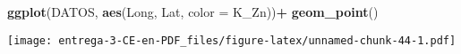 \documentclass[
]{article}
\newenvironment{Shaded}{\begin{snugshade}}{\end{snugshade}}
\newcommand{\DataTypeTok}[1]{\textcolor[rgb]{0.13,0.29,0.53}{#1}}
\newcommand{\DecValTok}[1]{\textcolor[rgb]{0.00,0.00,0.81}{#1}}
\newcommand{\KeywordTok}[1]{\textcolor[rgb]{0.13,0.29,0.53}{\textbf{#1}}}
\newcommand{\NormalTok}[1]{#1}
\newcommand{\OperatorTok}[1]{\textcolor[rgb]{0.81,0.36,0.00}{\textbf{#1}}}
\newcommand{\StringTok}[1]{\textcolor[rgb]{0.31,0.60,0.02}{#1}}
\begin{document}
\begin{Shaded}
\begin{Highlighting}[]
\KeywordTok{ggplot}\NormalTok{(DATOS, }\KeywordTok{aes}\NormalTok{(Long, Lat, }\DataTypeTok{color =}\NormalTok{ K_Zn))}\OperatorTok{+}
\StringTok{  }\KeywordTok{geom_point}\NormalTok{()}
\end{Highlighting}
\end{Shaded}

\texttt{[image: entrega-3-CE-en-PDF\_files/figure-latex/unnamed-chunk-44-1.pdf]}

\begin{Shaded}
\end{Shaded}
\end{document}
